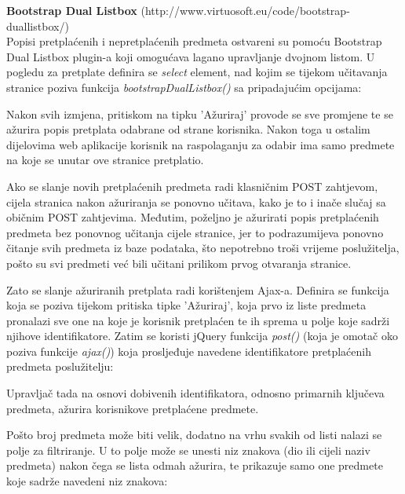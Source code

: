\documentclass[times, utf8, zavrsni]{fer}
\begin{document}
\textbf{Bootstrap Dual Listbox} (http://www.virtuosoft.eu/code/bootstrap-duallistbox/)\\
Popisi pretplaćenih i nepretplaćenih predmeta ostvareni su pomoću Bootstrap Dual Listbox plugin-a koji omogućava lagano upravljanje dvojnom listom. U pogledu za pretplate definira se \emph{select} element, nad kojim se tijekom učitavanja stranice poziva funkcija \emph{bootstrapDualListbox()} sa pripadajućim opcijama:

\lstset{style=js}


Nakon svih izmjena, pritiskom na tipku 'Ažuriraj' provode se sve promjene te se ažurira popis pretplata odabrane od strane korisnika. Nakon toga u ostalim dijelovima web aplikacije korisnik na raspolaganju za odabir ima samo predmete na koje se unutar ove stranice pretplatio.

Ako se slanje novih pretplaćenih predmeta radi klasničnim POST zahtjevom, cijela stranica nakon ažuriranja se ponovno učitava, kako je to i inače slučaj sa običnim POST zahtjevima. Međutim, poželjno je ažurirati popis pretplaćenih predmeta bez ponovnog učitanja cijele stranice, jer to podrazumijeva ponovno čitanje svih predmeta iz baze podataka, što nepotrebno troši vrijeme poslužitelja, pošto su svi predmeti već bili učitani prilikom prvog otvaranja stranice.

Zato se slanje ažuriranih pretplata radi korištenjem Ajax-a. Definira se funkcija koja se poziva tijekom pritiska tipke 'Ažuriraj', koja prvo iz liste predmeta pronalazi sve one na koje je korisnik pretplaćen te ih sprema u polje koje sadrži njihove identifikatore. Zatim se koristi jQuery funkcija \emph{post()} (koja je omotač oko poziva funkcije \emph{ajax()}) koja prosljeđuje navedene identifikatore pretplaćenih predmeta poslužitelju:
\clearpage

\lstset{style=js}


Upravljač tada na osnovi dobivenih identifikatora, odnosno primarnih ključeva predmeta, ažurira korisnikove pretplaćene predmete.

Pošto broj predmeta može biti velik, dodatno na vrhu svakih od listi nalazi se polje za filtriranje. U to polje može se unesti niz znakova (dio ili cijeli naziv predmeta) nakon čega se lista odmah ažurira, te prikazuje samo one predmete koje sadrže navedeni niz znakova:
\end{document}
